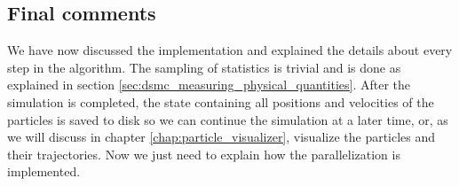 \subsection{Final comments}
We have now discussed the implementation and explained the details about every step in the algorithm. The sampling of statistics is trivial and is done as explained in section \ref{sec:dsmc_measuring_physical_quantities}. After the simulation is completed, the state containing all positions and velocities of the particles is saved to disk so we can continue the simulation at a later time, or, as we will discuss in chapter \ref{chap:particle_visualizer}, visualize the particles and their trajectories. Now we just need to explain how the parallelization is implemented. 